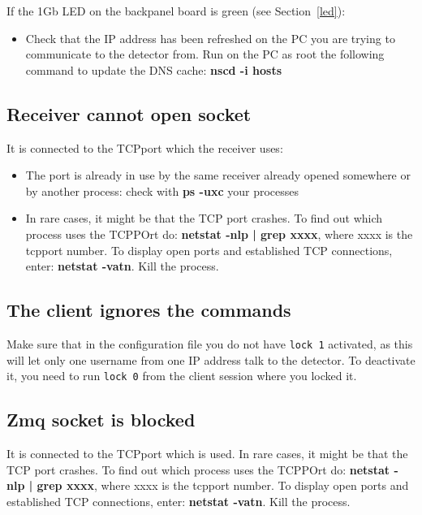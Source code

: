 \documentclass{article}
\begin{document}
{{{If the 1Gb LED on the backpanel board is green (see Section~\ref{led}):
\begin{itemize}
\item Check that the IP address has been refreshed on the PC you are trying to communicate to the detector from. Run on the PC as root the following command to update the DNS cache: \textbf{nscd -i hosts} 
\end{itemize}

\subsection{Receiver cannot open socket}
It is connected to the TCPport which the receiver uses:
\begin{itemize}
\item The port is already in use by the same receiver already opened somewhere or by another process: check with \textbf{ps -uxc} your processes
\item In rare cases, it might be that the TCP port crashes. To find out which process uses the TCPPOrt do: \textbf{netstat -nlp | grep xxxx}, where xxxx is the tcpport number. To display open ports and established TCP connections, enter: \textbf{netstat -vatn}. Kill the process.
 \end{itemize}

\subsection{The client ignores the commands}
Make sure that in the configuration file you do not have {\tt{lock 1}} activated, as this will let only one username from one IP address talk to the detector. 
To deactivate it, you need to run {\tt{lock 0}} from the client session where you locked it. 

\subsection{Zmq socket is blocked}
It is connected to the TCPport which is used. In rare cases, it might be that the TCP port crashes. To find out which process uses the TCPPOrt do: \textbf{netstat -nlp | grep xxxx}, where xxxx is the tcpport number. To display open ports and established TCP connections, enter: \textbf{netstat -vatn}. Kill the process.


}}}
\end{document}
